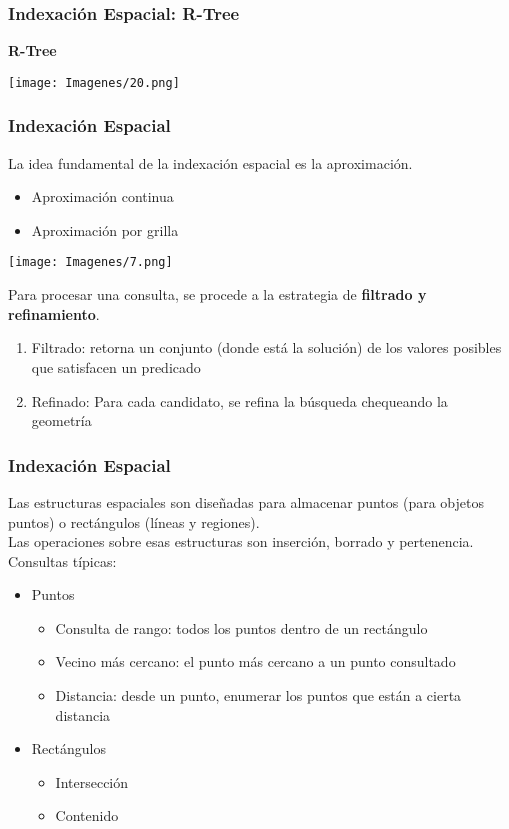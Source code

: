 \documentclass[12pt]{beamer}
\begin{document}
\begin{frame}
\frametitle{Indexaci\'on Espacial: R-Tree}
\textbf{R-Tree}\\
\begin{center}
\texttt{[image: Imagenes/20.png]}
\end{center}
\end{frame}

\begin{frame}
\frametitle{Indexaci\'on Espacial}
La idea fundamental de la indexaci\'on espacial es la aproximaci\'on.\\
\begin{small}
\begin{itemize}
\item Aproximaci\'on continua
\item Aproximaci\'on por grilla
\end{itemize}
\end{small}
\begin{center}
\texttt{[image: Imagenes/7.png]}
\end{center}
Para procesar una consulta, se procede a la estrategia de \textbf{filtrado y refinamiento}.
\begin{enumerate}
\item Filtrado: retorna un conjunto (donde est\'a la soluci\'on) de los valores posibles que satisfacen un predicado
\item Refinado: Para cada candidato, se refina la b\'usqueda chequeando la geometr\'ia
\end{enumerate}
\end{frame}

\begin{frame}
\frametitle{Indexaci\'on Espacial}
Las estructuras espaciales son dise\~nadas para almacenar puntos (para objetos puntos) o rect\'angulos (l\'ineas y regiones).\\
Las operaciones sobre esas estructuras son inserci\'on, borrado y pertenencia.\\
Consultas t\'ipicas:
\begin{itemize}
\item Puntos
\begin{itemize}
\item Consulta de rango: todos los puntos dentro de un rect\'angulo
\item Vecino m\'as cercano: el punto m\'as cercano a un punto consultado
\item Distancia: desde un punto, enumerar los puntos que est\'an a cierta distancia 
\end{itemize}
\item Rect\'angulos
\begin{itemize}
\item Intersecci\'on
\item Contenido
\end{itemize}
\end{itemize}
\end{frame}
\end{document}
